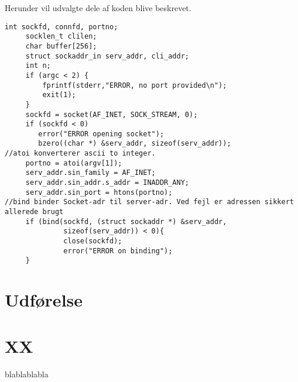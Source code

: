 \documentclass{article}
\begin{document}

Herunder vil udvalgte dele af koden blive beskrevet.\\





\begin{lstlisting}
int sockfd, connfd, portno;
     socklen_t clilen;
     char buffer[256];						
     struct sockaddr_in serv_addr, cli_addr;
     int n;
     if (argc < 2) {
         fprintf(stderr,"ERROR, no port provided\n");
         exit(1);
     }
     sockfd = socket(AF_INET, SOCK_STREAM, 0);
     if (sockfd < 0) 
        error("ERROR opening socket");
        bzero((char *) &serv_addr, sizeof(serv_addr));
//atoi konverterer ascii to integer. 
     portno = atoi(argv[1]);
     serv_addr.sin_family = AF_INET;
     serv_addr.sin_addr.s_addr = INADDR_ANY;
     serv_addr.sin_port = htons(portno);
//bind binder Socket-adr til server-adr. Ved fejl er adressen sikkert allerede brugt 
     if (bind(sockfd, (struct sockaddr *) &serv_addr,
              sizeof(serv_addr)) < 0){ 
              close(sockfd);
              error("ERROR on binding");
     }

\end{lstlisting}  



\newpage
\section{Udførelse}




\newpage
\section{XX}

blablablabla
\end{document}

